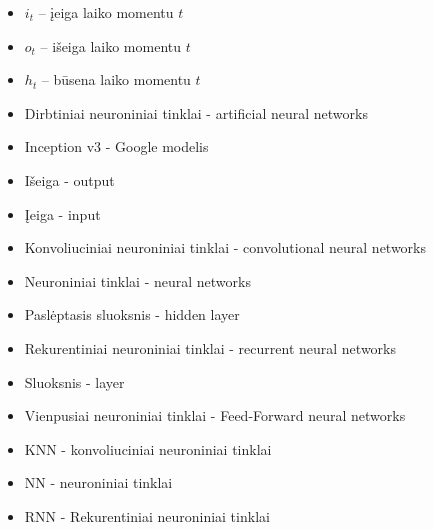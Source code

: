 \documentclass{VUMIFPSbakalaurinis}
\begin{document}
\printbibliography[heading=bibintoc]  %


\begin{itemize}
	\item $i_t$ – įeiga laiko momentu $t$
	\item $o_t$ – išeiga laiko momentu $t$
	\item $h_t$ – būsena laiko momentu $t$
\end{itemize}



\begin{itemize}
	\item Dirbtiniai neuroniniai tinklai - artificial neural networks
	\item Inception v3 - Google modelis
	\item Išeiga - output
	\item Įeiga - input
	\item Konvoliuciniai neuroniniai tinklai - convolutional neural networks
	\item Neuroniniai tinklai - neural networks
	\item Paslėptasis sluoksnis - hidden layer
	\item Rekurentiniai neuroniniai tinklai - recurrent neural networks
	\item Sluoksnis - layer
	\item Vienpusiai neuroniniai tinklai - Feed-Forward neural networks
\end{itemize}

\begin{itemize}
	\item KNN - konvoliuciniai neuroniniai tinklai
	\item NN - neuroniniai tinklai
	\item RNN - Rekurentiniai neuroniniai tinklai
	
\end{itemize}
\end{document}
